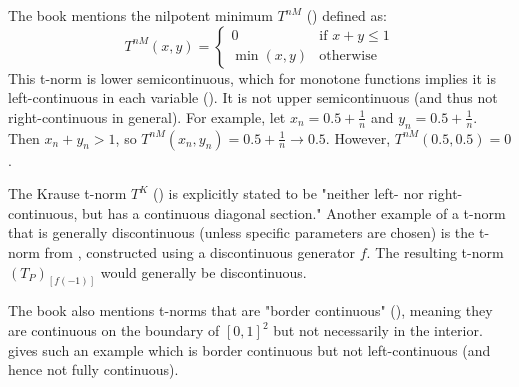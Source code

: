 \begin{example}
  The book mentions the nilpotent minimum $T^{nM}$ (\cite[Remark 1.21, p.~16 and Fig 1.5, p.~17]{Klement2000}) defined as:
  \[
  T^{nM}(x,y) =
  \begin{cases}
    0 & \text{if } x+y \leq 1 \\
    \min(x,y) & \text{otherwise}
  \end{cases}
  \]
  This t-norm is lower semicontinuous, which for monotone functions implies it is left-continuous in each variable (\cite[Proposition 1.22, p.~17]{Klement2000}). It is not upper semicontinuous (and thus not right-continuous in general). For example, let $x_n = 0.5 + \frac{1}{n}$ and $y_n = 0.5 + \frac{1}{n}$. Then $x_n+y_n > 1$, so $T^{nM}(x_n, y_n) = 0.5 + \frac{1}{n} \to 0.5$. However, $T^{nM}(0.5, 0.5) = 0$.
\end{example}

\begin{example}
  The Krause t-norm $T^K$ (\cite[Appendix B.1, p.~341 and Theorem B.1, p.~344]{Klement2000}) is explicitly stated to be "neither left- nor right-continuous, but has a continuous diagonal section."
  Another example of a t-norm that is generally discontinuous (unless specific parameters are chosen) is the t-norm from \cite[Example 3.21, p.~80]{Klement2000}, constructed using a discontinuous generator $f$. The resulting t-norm $(T_P)_{[f(-1)]}$ would generally be discontinuous.
\end{example}

\begin{remark}
  The book also mentions t-norms that are "border continuous" (\cite[Definition 1.23, p.~17]{Klement2000}), meaning they are continuous on the boundary of $[0,1]^2$ but not necessarily in the interior. \cite[Example 1.24(i), p.~18]{Klement2000} gives such an example which is border continuous but not left-continuous (and hence not fully continuous).
\end{remark}




















































